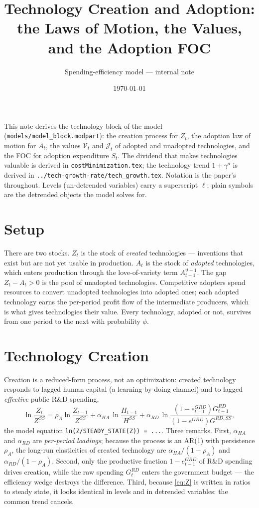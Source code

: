 \documentclass[11pt]{article}
\title{Technology Creation and Adoption:\\ the Laws of Motion, the Values, and the Adoption FOC}
\author{Spending-efficiency model --- internal note}
\date{\today}
\begin{document}
\maketitle

\noindent
This note derives the technology block of the model
(\texttt{models/model\_block.modpart}): the creation process for $Z_t$, the
adoption law of motion for $A_t$, the values $\mathcal{V}_t$ and $\mathcal{J}_t$
of adopted and unadopted technologies, and the FOC for adoption expenditure
$S_t$. The dividend that makes technologies valuable is derived in
\texttt{costMinimization.tex}; the technology trend $1+\gamma^{a}$ is derived in
\texttt{../tech-growth-rate/tech\_growth.tex}. Notation is the paper's throughout.
Levels (un-detrended variables) carry a superscript $\ell$; plain symbols are the
detrended objects the model solves for.

\section{Setup}

There are two stocks. $Z_t$ is the stock of \emph{created} technologies ---
inventions that exist but are not yet usable in production. $A_t$ is the stock of
\emph{adopted} technologies, which enters production through the love-of-variety
term $A_{t-1}^{\vartheta-1}$. The gap $Z_t - A_t > 0$ is the pool of unadopted
technologies. Competitive adopters spend resources to convert unadopted
technologies into adopted ones; each adopted technology earns the per-period
profit flow of the intermediate producers, which is what gives technologies their
value. Every technology, adopted or not, survives from one period to the next
with probability $\phi$.

\section{Technology Creation}

Creation is a reduced-form process, not an optimization: created technology
responds to lagged human capital (a learning-by-doing channel) and to lagged
\emph{effective} public R\&D spending,
\begin{equation}\label{eq:Z}
    \ln\frac{Z_t}{Z^{SS}} = \rho_A \ln\frac{Z_{t-1}}{Z^{SS}}
    + \alpha_{HA}\,\ln\frac{H_{t-1}}{H^{SS}}
    + \alpha_{RD}\,\ln\frac{\left(1-e^{GRD}_{t-1}\right) G^{RD}_{t-1}}
    {\left(1-e^{GRD}\right) G^{RD,SS}},
\end{equation}
the model equation \texttt{ln(Z/STEADY\_STATE(Z)) = ...}. Three remarks. First,
$\alpha_{HA}$ and $\alpha_{RD}$ are \emph{per-period loadings}; because the
process is an AR(1) with persistence $\rho_A$, the long-run elasticities of
created technology are $\alpha_{HA}/(1-\rho_A)$ and $\alpha_{RD}/(1-\rho_A)$.
Second, only the productive fraction $1-e^{GRD}_{t-1}$ of R\&D spending drives
creation, while the raw spending $G^{RD}_t$ enters the government budget --- the
efficiency wedge destroys the difference. Third, because \eqref{eq:Z} is written
in ratios to steady state, it looks identical in levels and in detrended
variables: the common trend cancels.
\end{document}
